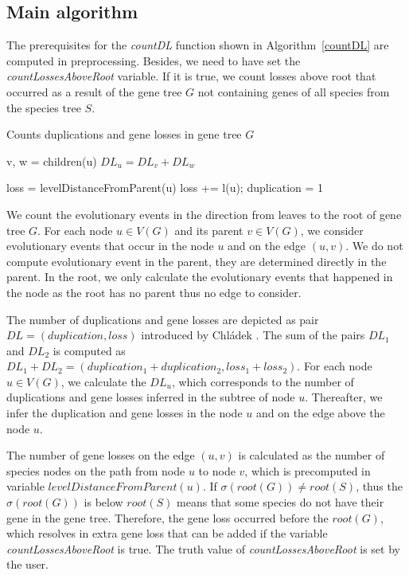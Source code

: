 \subsection{Main algorithm} \label{main_algorithm}

The prerequisites for the \emph{countDL} function shown in Algorithm~\ref{countDL} are computed in preprocessing. Besides, we need to have set the \emph{countLossesAboveRoot} variable. If it is true, we count losses above root that occurred as a result of the gene tree $G$ not containing genes of all species from the species tree $S$. 

\begin{algorithm}[!htbp]
\caption{Counts duplications and gene losses in gene tree $G$} 
\label{countDL}
\begin{algorithmic}[1]
		\State v, w = children(u)
		\State $DL_u = DL_v+DL_w$
	\EndIf

	\State loss = levelDistanceFromParent(u)
		\State loss += l(u); 
	\EndIf
		\State duplication = 1
	\EndIf
	
\EndFunction
\end{algorithmic}
\end{algorithm}

We count the evolutionary events in the direction from leaves to the root of gene tree $G$. For each node $u \in V(G)$ and its parent $v \in V(G)$, we consider evolutionary events that occur in the node $u$ and on the edge $(u, v)$. We do not compute evolutionary event in the parent, they are determined directly in the parent. In the root, we only calculate the evolutionary events that happened in the node as the root has no parent thus no edge to consider.

The number of duplications and gene losses are depicted as pair $DL = (duplication, loss)$ introduced by Chládek \cite{chladek_thesis}. The sum of the pairs $DL_1$ and $DL_2$ is computed as $DL_1+DL_2=(duplication_1+duplication_2, loss_1+loss_2)$. For each node $u \in V(G)$, we calculate the $DL_u$, which corresponds to the number of duplications and gene losses inferred in the subtree of node $u$. Thereafter, we infer the duplication and gene losses in the node $u$ and on the edge above the node $u$.

The number of gene losses on the edge $(u, v)$ is calculated as the number of species nodes on the path from node $u$ to node $v$, which is precomputed in variable $levelDistanceFromParent(u)$. If $\sigma(root(G)) \ne root(S)$, thus the $\sigma(root(G))$ is below $root(S)$ means that some species do not have their gene in the gene tree. Therefore, the gene loss occurred before the $root(G)$, which resolves in extra gene loss that can be added if the variable \emph{countLossesAboveRoot} is true. The truth value of \emph{countLossesAboveRoot} is set by the user.

